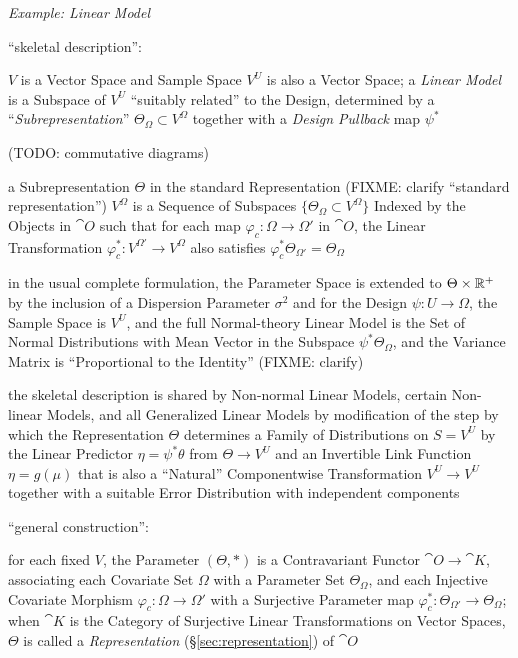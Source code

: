 \emph{Example: Linear Model}

``skeletal description'':

$V$ is a Vector Space and Sample Space $V^U$ is also a Vector Space; a
\emph{Linear Model} is a Subspace of $V^U$ ``suitably related'' to the Design,
determined by a ``\emph{Subrepresentation}'' $\Theta_\Omega \subset V^{\Omega}$
together with a \emph{Design Pullback} map $\psi^*$

(TODO: commutative diagrams)

a Subrepresentation $\Theta$ in the standard Representation (FIXME: clarify
``standard representation'') $V^{\Omega}$ is a
Sequence of Subspaces $\{ \Theta_\Omega \subset V^\Omega \}$ Indexed by the
Objects in $\cat{O}$ such that for each map $\varphi_c : \Omega \to \Omega'$ in
$\cat{O}$, the Linear Transformation $\varphi_c^* : V^{\Omega'} \to V^\Omega$
also satisfies $\varphi_c^* \Theta_{\Omega'} = \Theta_\Omega$

in the usual complete formulation, the Parameter Space is extended to
$\Theta \times \mathbb{R}^+$ by the inclusion of a Dispersion Parameter $\sigma^2$
and for the Design $\psi : U \to \Omega$, the Sample Space is $V^U$, and the
full Normal-theory Linear Model is the Set of Normal Distributions with Mean
Vector in the Subspace $\psi^*\Theta_\Omega$, and the Variance Matrix is
``Proportional to the Identity'' (FIXME: clarify)

the skeletal description is shared by Non-normal Linear Models, certain
Non-linear Models, and all Generalized Linear Models by modification of the step
by which the Representation $\Theta$ determines a Family of Distributions on
$S = V^U$ by the Linear Predictor $\eta = \psi^*\theta$ from $\Theta \to V^U$
and an Invertible Link Function $\eta = g(\mu)$ that is also a ``Natural''
Componentwise Transformation $V^U \to V^U$ together with a suitable Error
Distribution with independent components

``general construction'':

for each fixed $V$, the Parameter $(\Theta, *)$ is a Contravariant Functor
$\cat{O} \to \cat{K}$, associating each Covariate Set $\Omega$ with a Parameter
Set $\Theta_\Omega$, and each Injective Covariate Morphism
$\varphi_c : \Omega \to \Omega'$ with a Surjective Parameter map
$\varphi_c^* : \Theta_{\Omega'} \to \Theta_\Omega$; when $\cat{K}$ is the
Category of Surjective Linear Transformations on Vector Spaces, $\Theta$ is
called a \emph{Representation} (\S\ref{sec:representation}) of $\cat{O}$

